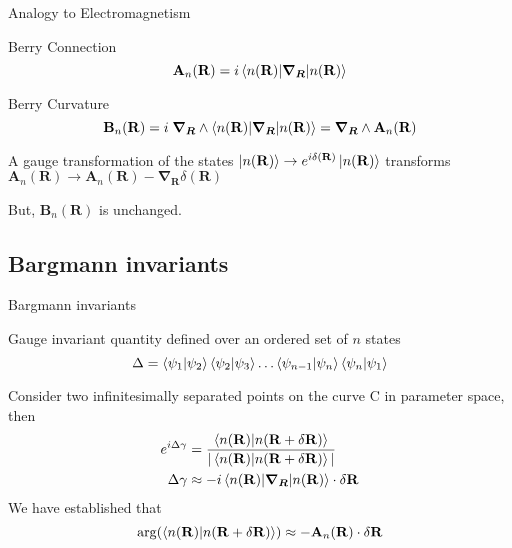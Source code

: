\documentclass{beamer}
\begin{document}
\begin{frame}{Analogy to Electromagnetism}
\begin{block}{Berry Connection}
\begin{equation*}
 \mathbf{A}_{n}(\mathbf{R}) = i\braket{n(\mathbf{R})| \bm{\nabla_{R}} | n(\mathbf{R})}
\end{equation*}
\end{block}
\begin{block}{Berry Curvature}
\begin{equation*}
 \mathbf{B}_{n}(\mathbf{R}) = i \;\bm{\nabla_{R}} \wedge \braket{n(\mathbf{R})| \bm{\nabla_{R}} | n(\mathbf{R})} = \bm{\nabla_{R}} \wedge \mathbf{A}_{n}(\mathbf{R})
\end{equation*}
\end{block}
A gauge transformation of the states $\ket{n(\mathbf{R})} \rightarrow e^{i\delta(\mathbf{R})} \ket{n(\mathbf{R})}$ transforms
$\mathbf{A}_{n}(\mathbf{R}) \rightarrow \mathbf{A}_{n}(\mathbf{R}) - \bm{\nabla_{R}} \delta(\mathbf{R})$

But, $\mathbf{B}_{n}(\mathbf{R})$ is unchanged.
\end{frame}

\subsection{Bargmann invariants}
\begin{frame}{Bargmann invariants}
\begin{Definition}\small
Gauge invariant quantity defined over an ordered set of $n$ states
\begin{equation}
 \Delta = \braket{\psi_1 | \psi_2}\braket{\psi_2 | \psi_3}\dots\braket{\psi_{n-1} | \psi_n}\braket{\psi_n | \psi_1}
\end{equation}
\end{Definition}
Consider two infinitesimally separated points on the curve C in parameter space, then
\begin{align*}
 e^{i\Delta\gamma} &= \frac{\braket{n(\mathbf{R})|n(\mathbf{R} +\delta\mathbf{R})}}{|\braket{n(\mathbf{R})|n(\mathbf{R} +\delta\mathbf{R})}|} \\
 \Delta\gamma	   &\approx  -i\braket{n(\mathbf{R})|\bm{\nabla_R}|n(\mathbf{R})}\cdot \delta\mathbf{R}
\end{align*}
We have established that 
\begin{equation}
 \arg(\braket{n(\mathbf{R})|n(\mathbf{R} +\delta\mathbf{R})}) \approx -\mathbf{A}_{n}(\mathbf{R}) \cdot \delta\mathbf{R}
\end{equation}\normalsize
\end{frame}
\end{document}
